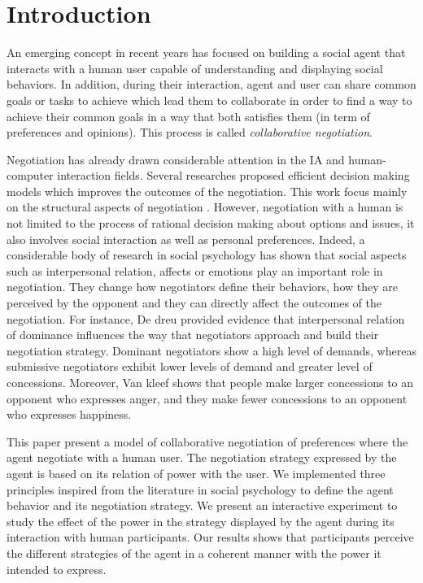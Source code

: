 \documentclass[runningheads,a4paper]{llncs}
\begin{document}
	
	\section{Introduction}
	An emerging concept in recent years has focused on building a social agent that interacts with a human user capable of understanding and displaying social behaviors. In addition, during their interaction, agent and user can share common goals or tasks to achieve which lead them to collaborate in order to find a way to achieve their common goals in a way that both satisfies them (in term of preferences and opinions). This process is called \emph{collaborative negotiation}.
	
	Negotiation has already drawn considerable attention in the IA and human-computer interaction fields. Several researches proposed efficient decision making models which improves the outcomes of the negotiation. This work focus mainly on the structural aspects of negotiation \cite{sycara2010agent,lai2009generic}. 
	However, negotiation with a human  is not limited to the process of rational decision making about options and
	issues, it also involves social interaction as well as personal preferences. Indeed, a considerable body of research in social psychology has shown that social aspects such as interpersonal relation, affects or emotions play an important role in negotiation. They change how negotiators define their behaviors, how they are perceived by the opponent and they can directly affect the outcomes of the negotiation.
	For instance, De dreu\cite{de1995impact} provided evidence that interpersonal relation of dominance influences the way that negotiators approach and build their negotiation strategy. Dominant negotiators show a high level of demands, whereas submissive negotiators exhibit lower levels of demand and greater level of concessions. Moreover, Van kleef \cite{van2006power}	shows that people make larger concessions to an opponent who expresses anger, and they make fewer concessions to an opponent who expresses happiness.

	This paper present a model of collaborative negotiation of preferences where the agent negotiate with a human user. The negotiation strategy expressed by the agent is based on its relation of power with the user. We implemented three principles inspired from the literature in social psychology to define the agent behavior and its negotiation strategy. We present an interactive experiment to study the effect of the power in the strategy displayed by the agent during its interaction with human participants. Our results shows that participants perceive the different strategies of the agent in a coherent manner with the power it intended to express. 
	
\end{document}
